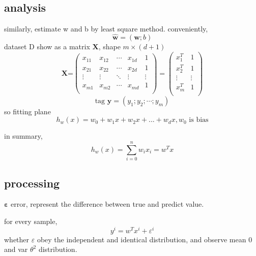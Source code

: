 \documentclass[12pt]{ctexart}%
\begin{document}
		\subsection{\quad analysis}
		similarly, estimate w and b by least square method. 
		conveniently, 
		\begin{equation}\hat{\boldsymbol{w}} = (\boldsymbol{w}; b)\end{equation}
		dataset D show as a matrix $\boldsymbol{X}$, shape $m\times (d+1)$
		\begin{equation}
			\boldsymbol{X}\text{=}
			\left( 
			\begin{matrix}
			{{x}_{11}} & {{x}_{12}} & \cdots  & {{x}_{1d}} & 1  \\
			{{x}_{21}} & {{x}_{22}} & \cdots  & {{x}_{2d}} & 1  \\
			\vdots  & \vdots  & \ddots  & \vdots  & \vdots   \\
			{{x}_{m1}} & {{x}_{m2}} & \cdots  & {{x}_{md}} & 1  \\
			\end{matrix} 
			\right)
			=
			\left( 
			\begin{matrix}
			x_{1}^{T} & 1  \\
			x_{2}^{T} & 1  \\
			\vdots  & \vdots   \\
			x_{m}^{T} & 1  \\
			\end{matrix} 
			\right)
		\end{equation}
		\begin{equation}\text{tag }\boldsymbol{y} = (y_1; y_2; \cdots; y_m)\end{equation}
		so fitting plane \begin{equation}h_w(x) = w_0+w_1x+w_2x+...+w_dx, w_0 
		\text{ is bias}\end{equation}
	
		in summary, \begin{equation}h_w(x) = \sum_{i=0}^{n}w_{i}x_{i} = w^{T}x\end{equation}
	
	\subsection{\quad processing}
	$\boldsymbol \varepsilon$ error, represent the difference between true and predict value.
	
	for every sample, \begin{equation}y^i = w^Tx^i + \varepsilon^i\end{equation}
	\qquad whether $\varepsilon$ obey the independent and identical distribution, and observe mean 0 and var $\theta^2$ distribution.
	
\end{document}
